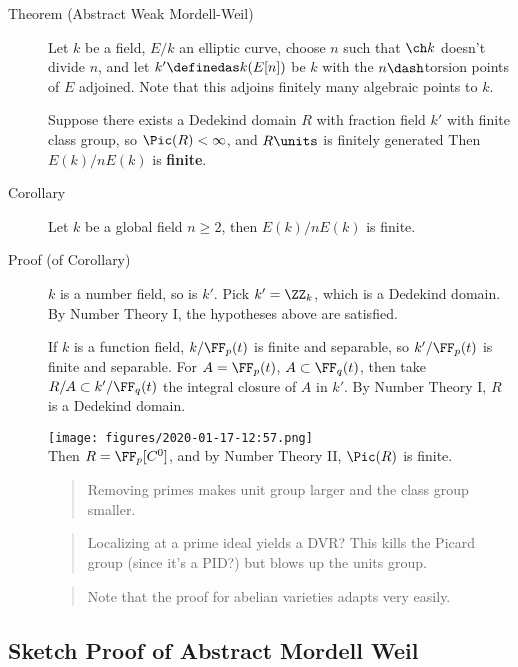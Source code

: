 \begin{description}
\item[Theorem (Abstract Weak Mordell-Weil)]
Let \(k\) be a field, \(E/k\) an elliptic curve, choose \(n\) such that
\(\ch k\) doesn't divide \(n\), and let \(k' \definedas k(E[n])\) be
\(k\) with the \(n\dash\)torsion points of \(E\) adjoined. Note that
this adjoins finitely many algebraic points to \(k\).

Suppose there exists a Dedekind domain \(R\) with fraction field \(k'\)
with finite class group, so \(\Pic(R) < \infty\), and \(R\units\) is
finitely generated Then \(E(k) / n E(k)\) is \textbf{finite}.
\item[Corollary]
Let \(k\) be a global field \(n\geq 2\), then \(E(k)/ n E(k)\) is
finite.
\item[Proof (of Corollary)]
\(k\) is a number field, so is \(k'\). Pick \(k' = \ZZ_k\), which is a
Dedekind domain. By Number Theory I, the hypotheses above are satisfied.

If \(k\) is a function field, \(k/\FF_p(t)\) is finite and separable, so
\(k' / \FF_p(t)\) is finite and separable. For \(A = \FF_p(t)\),
\(A \subset \FF_q(t)\), then take \(R/A \subset k'/\FF_q(t)\) the
integral closure of \(A\) in \(k'\). By Number Theory I, \(R\) is a
Dedekind domain.

\texttt{[image: figures/2020-01-17-12:57.png]}\\

Then \(R = \FF_p[C^0]\), and by Number Theory II, \(\Pic(R)\) is finite.

\begin{quote}
Removing primes makes unit group larger and the class group smaller.
\end{quote}

\begin{quote}
Localizing at a prime ideal yields a DVR? This kills the Picard group
(since it's a PID?) but blows up the units group.
\end{quote}

\begin{quote}
Note that the proof for abelian varieties adapts very easily.
\end{quote}
\end{description}

\hypertarget{sketch-proof-of-abstract-mordell-weil}{%
\subsection{Sketch Proof of Abstract Mordell
Weil}\label{sketch-proof-of-abstract-mordell-weil}}

